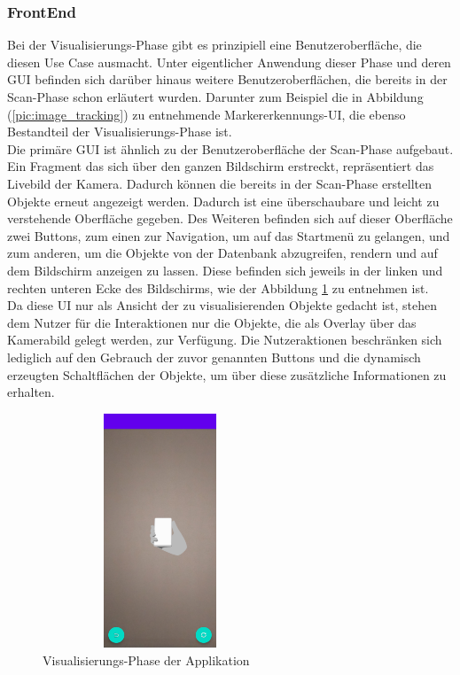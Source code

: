 \subsubsection{FrontEnd}
Bei der Visualisierungs-Phase gibt es prinzipiell eine Benutzeroberfläche, die diesen Use Case ausmacht. Unter eigentlicher Anwendung dieser Phase und 
deren \acs{GUI} befinden sich darüber hinaus weitere Benutzeroberflächen, die bereits in der Scan-Phase schon erläutert wurden. Darunter zum Beispiel 
die in Abbildung (\ref{pic:image_tracking}) zu entnehmende Markererkennungs-\acs{UI}, die ebenso Bestandteil der Visualisierungs-Phase ist. 
\\ 
Die primäre \acs{GUI} ist ähnlich zu der Benutzeroberfläche der Scan-Phase aufgebaut. Ein Fragment das sich über den ganzen Bildschirm erstreckt, repräsentiert das 
Livebild der Kamera. Dadurch können die bereits in der Scan-Phase erstellten Objekte erneut angezeigt werden. Dadurch ist eine überschaubare und leicht zu verstehende 
Oberfläche gegeben. Des Weiteren befinden 
sich auf dieser Oberfläche zwei Buttons, zum einen zur Navigation, um auf das Startmenü zu gelangen, und zum anderen, um die Objekte von der Datenbank 
abzugreifen, rendern und auf dem Bildschirm anzeigen zu lassen. Diese befinden sich jeweils in der linken und rechten unteren Ecke des Bildschirms, wie 
der Abbildung \ref{pic:visual} zu entnehmen ist. 
\\ 
Da diese \acs{UI} nur als Ansicht der zu visualisierenden Objekte gedacht ist, stehen dem Nutzer für die Interaktionen nur die Objekte, die als Overlay 
über das Kamerabild gelegt werden, zur Verfügung. Die Nutzeraktionen beschränken sich lediglich auf den Gebrauch der zuvor genannten Buttons und die dynamisch erzeugten 
Schaltflächen der Objekte, um über diese zusätzliche Informationen zu erhalten. 
\begin{figure}[hbt!]
    \centering
    \includegraphics[width=7cm,height=7cm,keepaspectratio]{4Umsetzung/Bilder/visual-phase.jpg}
    \caption{Visualisierungs-Phase der Applikation}
    \label{pic:visual}
\end{figure} 

